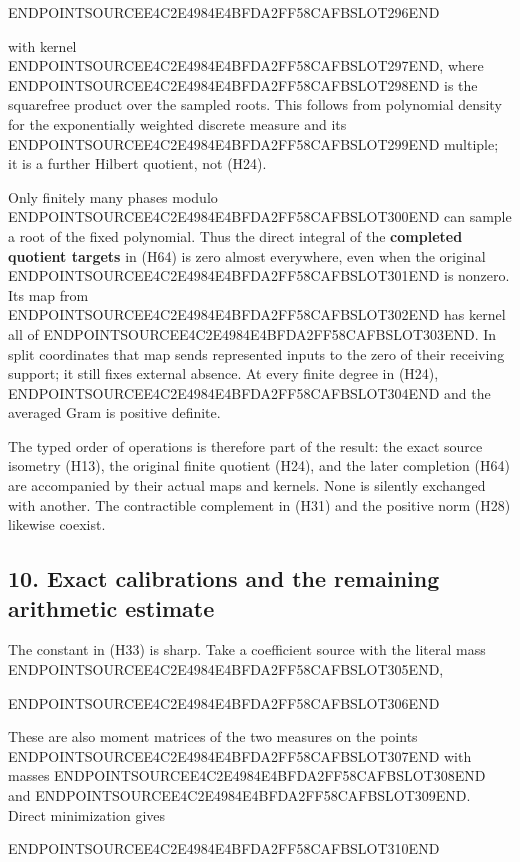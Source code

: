 ENDPOINTSOURCEE4C2E4984E4BFDA2FF58CAFBSLOT296END

with kernel ENDPOINTSOURCEE4C2E4984E4BFDA2FF58CAFBSLOT297END, where ENDPOINTSOURCEE4C2E4984E4BFDA2FF58CAFBSLOT298END is the squarefree product over the sampled roots. This follows from polynomial density for the exponentially weighted discrete measure and its ENDPOINTSOURCEE4C2E4984E4BFDA2FF58CAFBSLOT299END multiple; it is a further Hilbert quotient, not (H24).

Only finitely many phases modulo ENDPOINTSOURCEE4C2E4984E4BFDA2FF58CAFBSLOT300END can sample a root of the fixed polynomial. Thus the direct integral of the \textbf{completed quotient targets} in (H64) is zero almost everywhere, even when the original ENDPOINTSOURCEE4C2E4984E4BFDA2FF58CAFBSLOT301END is nonzero. Its map from ENDPOINTSOURCEE4C2E4984E4BFDA2FF58CAFBSLOT302END has kernel all of ENDPOINTSOURCEE4C2E4984E4BFDA2FF58CAFBSLOT303END. In split coordinates that map sends represented inputs to the zero of their receiving support; it still fixes external absence. At every finite degree in (H24), ENDPOINTSOURCEE4C2E4984E4BFDA2FF58CAFBSLOT304END and the averaged Gram is positive definite.

The typed order of operations is therefore part of the result: the exact source isometry (H13), the original finite quotient (H24), and the later completion (H64) are accompanied by their actual maps and kernels. None is silently exchanged with another. The contractible complement in (H31) and the positive norm (H28) likewise coexist.

\subsection{10. Exact calibrations and the remaining arithmetic estimate}\label{endpoint-holonomy_original--exact-calibrations-and-the-remaining-arithmetic-estimate}

The constant in (H33) is sharp. Take a coefficient source with the literal mass ENDPOINTSOURCEE4C2E4984E4BFDA2FF58CAFBSLOT305END,

ENDPOINTSOURCEE4C2E4984E4BFDA2FF58CAFBSLOT306END

These are also moment matrices of the two measures on the points ENDPOINTSOURCEE4C2E4984E4BFDA2FF58CAFBSLOT307END with masses ENDPOINTSOURCEE4C2E4984E4BFDA2FF58CAFBSLOT308END and ENDPOINTSOURCEE4C2E4984E4BFDA2FF58CAFBSLOT309END. Direct minimization gives

ENDPOINTSOURCEE4C2E4984E4BFDA2FF58CAFBSLOT310END

